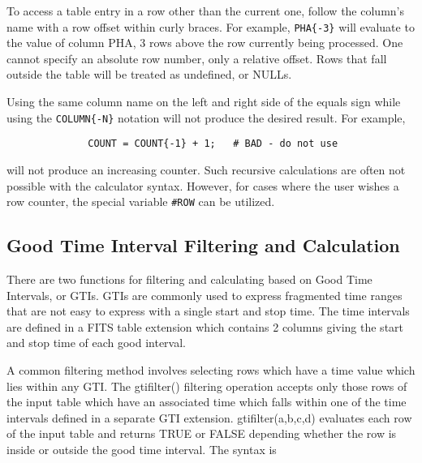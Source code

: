 \documentclass[11pt]{book}
\begin{document}
    To access a table entry in a row other  than the current one, follow
    the  column's name  with  a row  offset  within  curly  braces.  For
    example, \verb+PHA{-3}+ will evaluate to the value  of column PHA, 3 rows
    above  the  row currently  being processed.   One  cannot specify an
    absolute row number, only a relative offset.  Rows that fall outside
    the table will be treated as undefined, or NULLs.

    Using the same column name on the left and right side of the equals
    sign while using the \verb+COLUMN{-N}+ notation will not produce the desired
    result.  For example,
\begin{verbatim}
              COUNT = COUNT{-1} + 1;   # BAD - do not use
\end{verbatim}
    will not produce an increasing counter.  Such recursive
    calculations are often not possible with the calculator syntax.  
    However, for cases where the user wishes a row counter, the special 
    variable \verb+#ROW+ can be utilized.

\subsection{Good Time Interval Filtering and Calculation}

    There are two functions for filtering and calculating based
    on Good Time Intervals, or GTIs.  GTIs are commonly used to
    express fragmented time ranges that are not easy to express with a
    single start and stop time.  The time intervals are defined in a
    FITS table extension which contains 2 columns giving the
    start and stop time of each good interval.

    A common filtering method involves selecting rows which have a
    time value which lies within any GTI.  The gtifilter() filtering
    operation accepts only those rows of the input table which have an
    associated time which falls within one of the time intervals
    defined in a separate GTI extension.  gtifilter(a,b,c,d) evaluates
    each row of the input table and returns TRUE or FALSE depending
    whether the row is inside or outside the good time interval.  The
    syntax is
\end{document}
